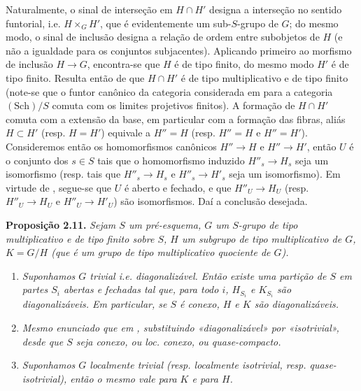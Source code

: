 Naturalmente, o sinal de interseção em \(H\cap H'\) designa a
interseção no sentido funtorial, i.e. \(H\times_G H'\), que é
evidentemente um sub-\(S\)-grupo de \(G\); do mesmo modo, o sinal de
inclusão designa a relação de ordem entre subobjetos de \(H\) (e não
a igualdade para os conjuntos subjacentes). Aplicando primeiro
 ao morfismo de inclusão
\(H\to G\), encontra-se que \(H\) é de tipo finito, do mesmo modo
\(H'\) é de tipo finito. Resulta então de
 que \(H\cap H'\) é de tipo
multiplicativo e de tipo finito (note-se que o funtor canônico da
categoria considerada em 
para a categoria \((\mathrm{Sch})/S\) comuta com os limites
projetivos finitos). A formação de \(H\cap H'\) comuta com a
extensão da base, em particular com a formação das fibras, aliás
\(H\subset H'\) (resp. \(H=H'\)) equivale a \(H''=H\) (resp.
\(H''=H\) e \(H''=H'\)). Consideremos então os homomorfismos
canônicos \(H''\to H\) e \(H''\to H'\), então \(U\) é o conjunto
dos \(s\in S\) tais que o homomorfismo induzido \(H''_s\to H_s\)
seja um isomorfismo (resp. tais que \(H''_s\to H_s\) e
\(H''_s\to H'_s\) seja um isomorfismo).
Em virtude de , segue-se que
\(U\) é aberto e fechado, e que \(H''_U\to H_U\) (resp.
\(H''_U\to H_U\) e \(H''_U\to H'_U\)) são isomorfismos. Daí a
conclusão desejada.

\medskip
\noindent{}\textbf{Proposição 2.11.}
\textit{Sejam \(S\) um pré-esquema, \(G\) um \(S\)-grupo de tipo
multiplicativo e de tipo finito sobre \(S\), \(H\) um subgrupo de tipo
multiplicativo de \(G\), \(K=G/H\) (que é um grupo de tipo
multiplicativo quociente de \(G\)).}
\begin{enumerate}
  \item[(i)]
  \textit{Suponhamos \(G\) trivial i.e. diagonalizável.
  Então existe uma partição de \(S\) em partes \(S_i\) abertas e fechadas
  tal que, para todo \(i\), \(H_{S_i}\) e \(K_{S_i}\) são
  diagonalizáveis. Em particular, se \(S\) é conexo, \(H\) e \(K\) são
  diagonalizáveis.}

  \item[(ii)]
  \textit{Mesmo enunciado que em
  , substituindo
  «diagonalizável» por «isotrivial», desde que \(S\) seja conexo,
  ou loc. conexo, ou quase-compacto.}

  \item[(iii)]
  \textit{Suponhamos \(G\) localmente trivial (resp. localmente
  isotrivial, resp. quase-isotrivial), então o mesmo vale para \(K\)
  e para \(H\).}
\end{enumerate}

